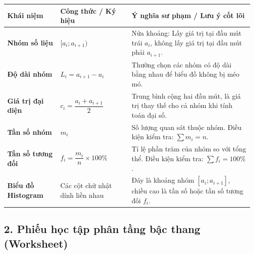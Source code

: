 \documentclass[12pt, a4paper]{article}
\begin{document}
\begin{center}
\small
\begin{tabularx}{\textwidth}{|p{3.5cm}|X|X|}
\hline
\textbf{Khái niệm} & \textbf{Công thức / Ký hiệu} & \textbf{Ý nghĩa sư phạm / Lưu ý cốt lõi} \\ \hline
\textbf{Nhóm số liệu} & $[a_i; a_{i+1})$ & Nửa khoảng: Lấy giá trị tại đầu mút trái $a_i$, không lấy giá trị tại đầu mút phải $a_{i+1}$. \\ \hline
\textbf{Độ dài nhóm} & $L_i = a_{i+1} - a_i$ & Thường chọn các nhóm có độ dài bằng nhau để biểu đồ không bị méo mó. \\ \hline
\textbf{Giá trị đại diện} & $c_i = \dfrac{a_i + a_{i+1}}{2}$ & Trung bình cộng hai đầu mút, là giá trị thay thế cho cả nhóm khi tính toán đại số. \\ \hline
\textbf{Tần số nhóm} & $m_i$ & Số lượng quan sát thuộc nhóm. Điều kiện kiểm tra: $\sum m_i = n$. \\ \hline
\textbf{Tần số tương đối} & $f_i = \dfrac{m_i}{n} \times 100\%$ & Tỉ lệ phần trăm của nhóm so với tổng thể. Điều kiện kiểm tra: $\sum f_i = 100\%$. \\ \hline
\textbf{Biểu đồ Histogram} & Các cột chữ nhật dính liền nhau & Đáy là khoảng nhóm $[a_i; a_{i+1}]$, chiều cao là tần số hoặc tần số tương đối $f_i$. \\ \hline
\end{tabularx}
\end{center}

\subsection*{2. Phiếu học tập phân tầng bậc thang (Worksheet)}
\end{document}
